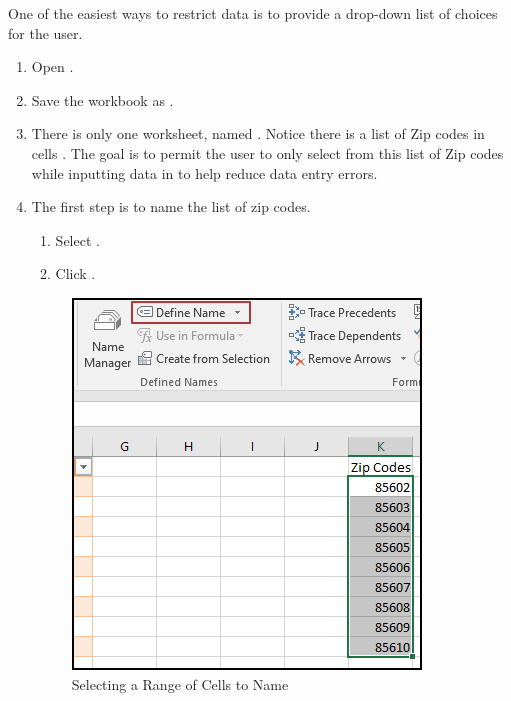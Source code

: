 One of the easiest ways to restrict data is to provide a drop-down list of choices for the user. 

\begin{enumerate}
	\item Open .
	\item Save the workbook as .
	\item There is only one worksheet, named . Notice there is a list of Zip codes in cells . The goal is to permit the user to only select from this list of Zip codes while inputting data in  to help reduce data entry errors.
	\item The first step is to name the list of zip codes.
	
	\begin{enumerate}
		\item Select .
		\item Click .
	\end{enumerate}
	
	\begin{figure}[H]
		\centering
		\includegraphics[width=\maxwidth{.75\linewidth}]{gfx/ch07_fig33}
		\caption{Selecting a Range of Cells to Name}
		\label{07:fig33}
	\end{figure}
	

\end{enumerate}
